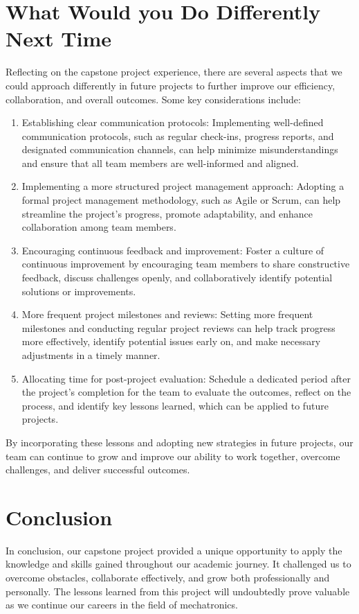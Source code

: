 \documentclass{article}
\begin{document}
\section{What Would you Do Differently Next Time}
Reflecting on the capstone project experience, there are several aspects that we could approach differently in future projects to further improve our efficiency, collaboration, and overall outcomes. Some key considerations include:
\begin{enumerate}
    \item Establishing clear communication protocols: Implementing well-defined communication protocols, such as regular check-ins, progress reports, and designated communication channels, can help minimize misunderstandings and ensure that all team members are well-informed and aligned.
    \item Implementing a more structured project management approach: Adopting a formal project management methodology, such as Agile or Scrum, can help streamline the project's progress, promote adaptability, and enhance collaboration among team members.
    \item Encouraging continuous feedback and improvement: Foster a culture of continuous improvement by encouraging team members to share constructive feedback, discuss challenges openly, and collaboratively identify potential solutions or improvements.
    \item More frequent project milestones and reviews: Setting more frequent milestones and conducting regular project reviews can help track progress more effectively, identify potential issues early on, and make necessary adjustments in a timely manner.
    \item Allocating time for post-project evaluation: Schedule a dedicated period after the project's completion for the team to evaluate the outcomes, reflect on the process, and identify key lessons learned, which can be applied to future projects.
\end{enumerate}
By incorporating these lessons and adopting new strategies in future projects, our team can continue to grow and improve our ability to work together, overcome challenges, and deliver successful outcomes.
\section{Conclusion}
In conclusion, our capstone project provided a unique opportunity to apply the knowledge and skills gained throughout our academic journey. It challenged us to overcome obstacles, collaborate effectively, and grow both professionally and personally. The lessons learned from this project will undoubtedly prove valuable as we continue our careers in the field of mechatronics.
\end{document}
